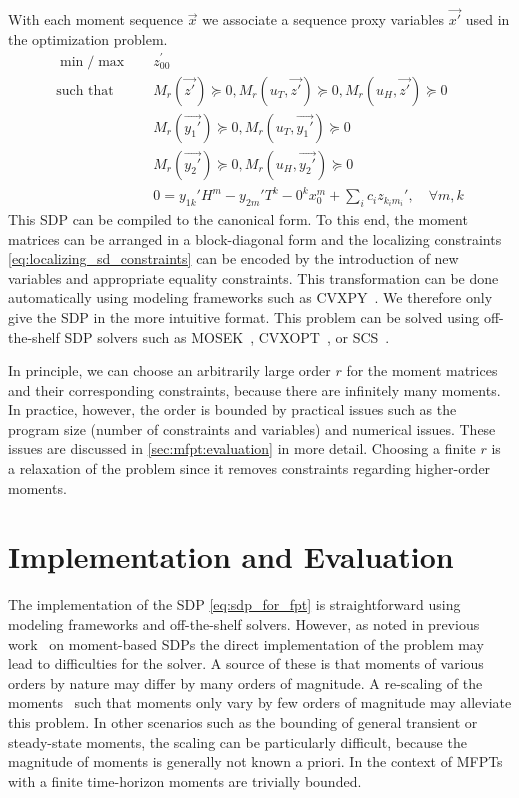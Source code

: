 With each moment sequence $\vec x$ we associate a sequence proxy variables $\vec{x'}$
used in the optimization problem.
\begin{equation}\label{eq:sdp_for_fpt}
    \begin{split}
        \min / \max \hspace{1em}&  z_{00}^{\prime} \\
        \text{such that}\hspace{1em} & M_r(\vec{z'})\succeq 0,
                   M_r({u}_T, \vec{z'})\succeq 0, M_r({u}_H, \vec{z'})\succeq 0\\
        & M_r(\vec{y_1'}) \succeq 0, M_r({u}_T,\vec{y_1'}) \succeq 0\\
        & M_r(\vec{y_2'}) \succeq 0, M_r({u}_H, \vec{y_2'}) \succeq 0\\
        & 0= y_{1k}' H^m -  y_{2m}'T^k - 0^k x_0^m +\sum_i c_i  z_{k_i m_i}', \quad\forall m, k
    \end{split}
\end{equation}
This SDP can be compiled to the canonical form.
To this end, the moment matrices can be arranged in a block-diagonal form and the
localizing constraints \eqref{eq:localizing_sd_constraints} can be encoded
by the introduction of new variables and appropriate equality constraints.
This transformation can be done automatically using modeling frameworks
such as CVXPY~\cite{cvxpy}. We therefore only give the SDP in the more intuitive format.
This problem can be solved using off-the-shelf SDP solvers such as MOSEK~\cite{mosek},
CVXOPT~\cite{vandenberghe2010cvxopt}, or SCS~\cite{scs}.

In principle, we can choose an arbitrarily large order $r$ for the moment matrices
and their corresponding constraints, because there are
infinitely many moments.
In practice, however, the order is bounded by practical issues such as the program size
(number of constraints and variables) and numerical issues.
These issues are discussed in \autoref{sec:mfpt:evaluation} in more detail.
Choosing a finite $r$ is a relaxation of the problem since it removes constraints regarding
higher-order moments.


\section{Implementation and Evaluation}\label{sec:mfpt:evaluation}
The implementation of the SDP \eqref{eq:sdp_for_fpt} is straightforward using
modeling frameworks and off-the-shelf solvers.
However, as noted in previous work~\cite{dowdy2018dynamic,sakurai2017convex,dowdy2018bounds,sakurai2019bounding} on moment-based SDPs
the direct implementation of the problem may lead to difficulties for the solver.
A source of these is that moments of various orders by nature
may differ by many orders of magnitude.
A re-scaling of the moments~\cite{dowdy2018bounds,sakurai2019bounding}
such that moments only vary by few orders of magnitude
may alleviate this problem.
In other scenarios such as the bounding of general transient or steady-state moments,
the scaling can be particularly difficult,
because the magnitude of moments is generally not known
a priori. In the context of MFPTs with a finite time-horizon
moments are trivially bounded.

